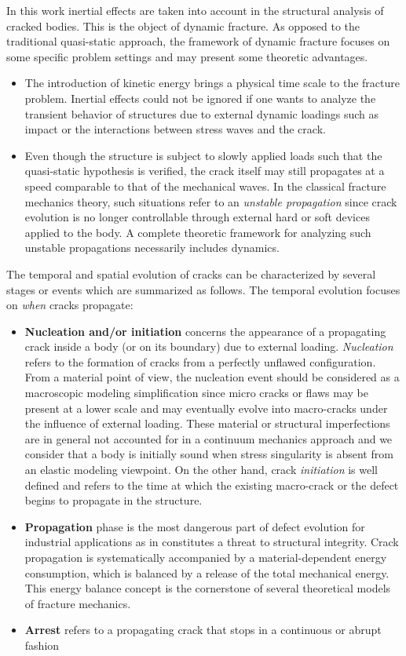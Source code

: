 In this work inertial effects are taken into account in the structural analysis of cracked bodies. This is the object of dynamic fracture. As opposed to the traditional quasi-static approach, the framework of dynamic fracture focuses on some specific problem settings and may present some theoretic advantages.
\begin{itemize}
\item The introduction of kinetic energy brings a physical time scale to the fracture problem. Inertial effects could not be ignored if one wants to analyze the transient behavior of structures due to external dynamic loadings such as impact or the interactions between stress waves and the crack.

\item Even though the structure is subject to slowly applied loads such that the quasi-static hypothesis is verified, the crack itself may still propagates at a speed comparable to that of the mechanical waves. In the classical fracture mechanics theory, such situations refer to an \emph{unstable propagation} since crack evolution is no longer controllable through external hard or soft devices applied to the body. A complete theoretic framework for analyzing such unstable propagations necessarily includes dynamics.
\end{itemize}

The temporal and spatial evolution of cracks can be characterized by several stages or events which are summarized as follows. The temporal evolution focuses on \emph{when} cracks propagate:
\begin{itemize}
\item \textbf{Nucleation and/or initiation} concerns the appearance of a propagating crack inside a body (or on its boundary) due to external loading. \emph{Nucleation} refers to the formation of cracks from a perfectly unflawed configuration. From a material point of view, the nucleation event should be considered as a macroscopic modeling simplification since micro cracks or flaws may be present at a lower scale and may eventually evolve into macro-cracks under the influence of external loading. These material or structural imperfections are in general not accounted for in a continuum mechanics approach and we consider that a body is initially sound when stress singularity is absent from an elastic modeling viewpoint. On the other hand, crack \emph{initiation} is well defined and refers to the time at which the existing macro-crack or the defect begins to propagate in the structure.

\item \textbf{Propagation} phase is
the most dangerous part of defect evolution for industrial applications as in constitutes a threat to structural integrity. Crack propagation is systematically accompanied by a material-dependent energy consumption, which is balanced by a release of the total mechanical energy. This energy balance concept is the cornerstone of several theoretical models of fracture mechanics.

\item \textbf{Arrest} refers to a propagating crack that stops in a continuous or abrupt fashion
\end{itemize}

